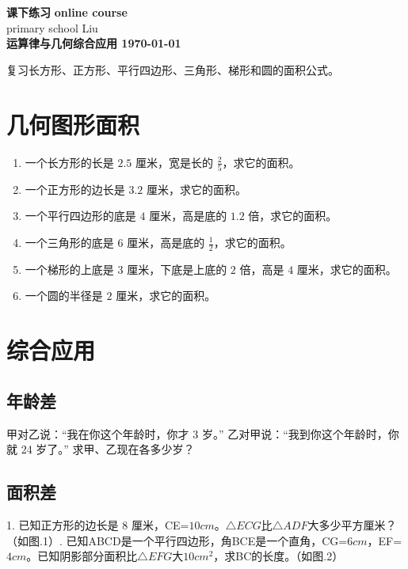 \documentclass[DIN, pagenumber=false, fontsize=11pt, parskip=half]{scrartcl}
\newcommand{\mytitle}[1]{{\noindent\Large\textbf{#1}}}
\begin{document}
\noindent\textbf{课下练习} \hfill \textbf{online course}\\
primary school \hfill Liu\\

\mytitle{运算律与几何综合应用 \hfill \today}
\newline
\begin{parchmentquote}
    复习长方形、正方形、平行四边形、三角形、梯形和圆的面积公式。\newline

\end{parchmentquote}


\section{几何图形面积}
\begin{enumerate}
    \item 一个长方形的长是 $2.5$ 厘米，宽是长的 $\frac{2}{5}$，求它的面积。
    \item 一个正方形的边长是 $3.2$ 厘米，求它的面积。
    \item 一个平行四边形的底是 $4$ 厘米，高是底的 $1.2$ 倍，求它的面积。
    \item 一个三角形的底是 $6$ 厘米，高是底的 $\frac{1}{2}$，求它的面积。
    \item 一个梯形的上底是 $3$ 厘米，下底是上底的 $2$ 倍，高是 $4$ 厘米，求它的面积。
    \item 一个圆的半径是 $2$ 厘米，求它的面积。
\end{enumerate}

\section{综合应用}

\subsection{年龄差}
甲对乙说：“我在你这个年龄时，你才 3 岁。”
乙对甲说：“我到你这个年龄时，你就 24 岁了。”
求甲、乙现在各多少岁？
\subsection{面积差}
1. 已知正方形的边长是 $8$ 厘米，CE=$10cm$。$\triangle ECG$比$\triangle ADF$大多少平方厘米？（如图.1）. 已知ABCD是一个平行四边形，角BCE是一个直角，CG=$6cm$，EF=$4cm$。已知阴影部分面积比$\triangle EFG$大$10cm^2$，求BC的长度。（如图.2）
\end{document}

